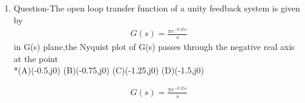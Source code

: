 \begin{enumerate}[label=\thesection.\arabic*.,ref=\thesection.\theenumi]
\item Question-The open loop transfer function of a unity feedback system is given by
\begin{align*}
 G(s)=\frac{\pi e^{-0.25s}}{s}
\end{align*}
in G(s) plane,the Nyquist plot of G(s) passes through the negative real axis at the point
\\*(A)(-0.5,j0)  (B)(-0.75,j0)  (C)(-1.25,j0)  (D)(-1.5,j0)


 

\solution
\begin{align}
G(s)=\frac{\pi e^{-0.25s}}{s}
\end{align}


\end{enumerate}
